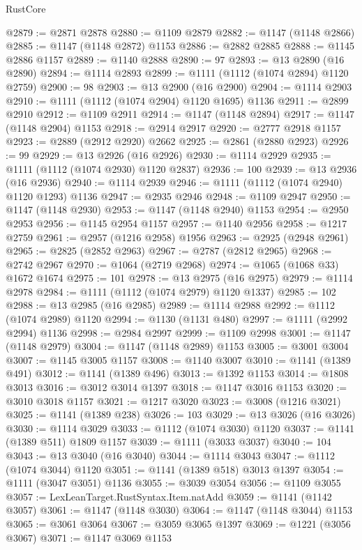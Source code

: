 \begin{lexlean}{RustCore}
\begin{coremodule}
@2879 := @2871 @2878
@2880 := @1109 @2879
@2882 := @1147 (@1148 @2866)
@2885 := @1147 (@1148 @2872) @1153
@2886 := @2882 @2885
@2888 := @1145 @2886 @1157
@2889 := @1140 @2888
@2890 := 97
@2893 := @13 @2890 (@16 @2890)
@2894 := @1114 @2893
@2899 := @1111 (@1112 (@1074 @2894) @1120 @2759)
@2900 := 98
@2903 := @13 @2900 (@16 @2900)
@2904 := @1114 @2903
@2910 := @1111 (@1112 (@1074 @2904) @1120 @1695) @1136
@2911 := @2899 @2910
@2912 := @1109 @2911
@2914 := @1147 (@1148 @2894)
@2917 := @1147 (@1148 @2904) @1153
@2918 := @2914 @2917
@2920 := @2777 @2918 @1157
@2923 := @2889 (@2912 @2920) @2662
@2925 := @2861 (@2880 @2923)
@2926 := 99
@2929 := @13 @2926 (@16 @2926)
@2930 := @1114 @2929
@2935 := @1111 (@1112 (@1074 @2930) @1120 @2837)
@2936 := 100
@2939 := @13 @2936 (@16 @2936)
@2940 := @1114 @2939
@2946 := @1111 (@1112 (@1074 @2940) @1120 @1293) @1136
@2947 := @2935 @2946
@2948 := @1109 @2947
@2950 := @1147 (@1148 @2930)
@2953 := @1147 (@1148 @2940) @1153
@2954 := @2950 @2953
@2956 := @1145 @2954 @1157
@2957 := @1140 @2956
@2958 := @1217 @2759
@2961 := @2957 (@1216 @2958) @1956
@2963 := @2925 (@2948 @2961)
@2965 := @2825 (@2852 @2963)
@2967 := @2787 (@2812 @2965)
@2968 := @2742 @2967
@2970 := @1064 (@2719 @2968)
@2974 := @1065 (@1068 @33) @1672 @1674
@2975 := 101
@2978 := @13 @2975 (@16 @2975)
@2979 := @1114 @2978
@2984 := @1111 (@1112 (@1074 @2979) @1120 @1337)
@2985 := 102
@2988 := @13 @2985 (@16 @2985)
@2989 := @1114 @2988
@2992 := @1112 (@1074 @2989) @1120
@2994 := @1130 (@1131 @480)
@2997 := @1111 (@2992 @2994) @1136
@2998 := @2984 @2997
@2999 := @1109 @2998
@3001 := @1147 (@1148 @2979)
@3004 := @1147 (@1148 @2989) @1153
@3005 := @3001 @3004
@3007 := @1145 @3005 @1157
@3008 := @1140 @3007
@3010 := @1141 (@1389 @491)
@3012 := @1141 (@1389 @496)
@3013 := @1392 @1153
@3014 := @1808 @3013
@3016 := @3012 @3014 @1397
@3018 := @1147 @3016 @1153
@3020 := @3010 @3018 @1157
@3021 := @1217 @3020
@3023 := @3008 (@1216 @3021)
@3025 := @1141 (@1389 @238)
@3026 := 103
@3029 := @13 @3026 (@16 @3026)
@3030 := @1114 @3029
@3033 := @1112 (@1074 @3030) @1120
@3037 := @1141 (@1389 @511) @1809 @1157
@3039 := @1111 (@3033 @3037)
@3040 := 104
@3043 := @13 @3040 (@16 @3040)
@3044 := @1114 @3043
@3047 := @1112 (@1074 @3044) @1120
@3051 := @1141 (@1389 @518) @3013 @1397
@3054 := @1111 (@3047 @3051) @1136
@3055 := @3039 @3054
@3056 := @1109 @3055
@3057 := LexLeanTarget.RustSyntax.Item.natAdd
@3059 := @1141 (@1142 @3057)
@3061 := @1147 (@1148 @3030)
@3064 := @1147 (@1148 @3044) @1153
@3065 := @3061 @3064
@3067 := @3059 @3065 @1397
@3069 := @1221 (@3056 @3067)
@3071 := @1147 @3069 @1153

\end{coremodule}
\end{lexlean}
